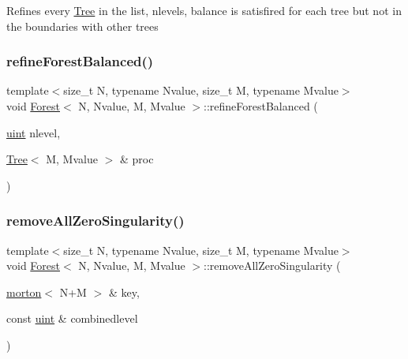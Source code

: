 Refines every \mbox{\hyperlink{classTree}{Tree}} in the list, nlevels, balance is satisfired for each tree but not in the boundaries with other trees \mbox{\label{classForest_a65086c4cc28f331b64770e5fa78d5f56}} 
\subsubsection{\texorpdfstring{refine\+Forest\+Balanced()}{refineForestBalanced()}}
{\footnotesize\ttfamily template$<$size\+\_\+t N, typename Nvalue, size\+\_\+t M, typename Mvalue$>$ \\
void \mbox{\hyperlink{classForest}{Forest}}$<$ N, Nvalue, M, Mvalue $>$\+::refine\+Forest\+Balanced (\begin{DoxyParamCaption}\item[{\mbox{\hyperlink{definitions_8h_a69aa29b598b851b0640aa225a9e5d61d}{uint}}}]{nlevel,  }\item[{\mbox{\hyperlink{classTree}{Tree}}$<$ M, Mvalue $>$ \&}]{proc }\end{DoxyParamCaption})}

\mbox{\label{classForest_a85bd0fc70786ac0d45b35b5f2ef0b822}} 
\subsubsection{\texorpdfstring{remove\+All\+Zero\+Singularity()}{removeAllZeroSingularity()}}
{\footnotesize\ttfamily template$<$size\+\_\+t N, typename Nvalue, size\+\_\+t M, typename Mvalue$>$ \\
void \mbox{\hyperlink{classForest}{Forest}}$<$ N, Nvalue, M, Mvalue $>$\+::remove\+All\+Zero\+Singularity (\begin{DoxyParamCaption}\item[{\mbox{\hyperlink{definitions_8h_af8682350bd8bb38ee9023f7a0a310add}{morton}}$<$ N+M $>$ \&}]{key,  }\item[{const \mbox{\hyperlink{definitions_8h_a69aa29b598b851b0640aa225a9e5d61d}{uint}} \&}]{combinedlevel }\end{DoxyParamCaption})}

\mbox{\label{classForest_a2c547cde298d9665e3ef791a43f13abe}} 
